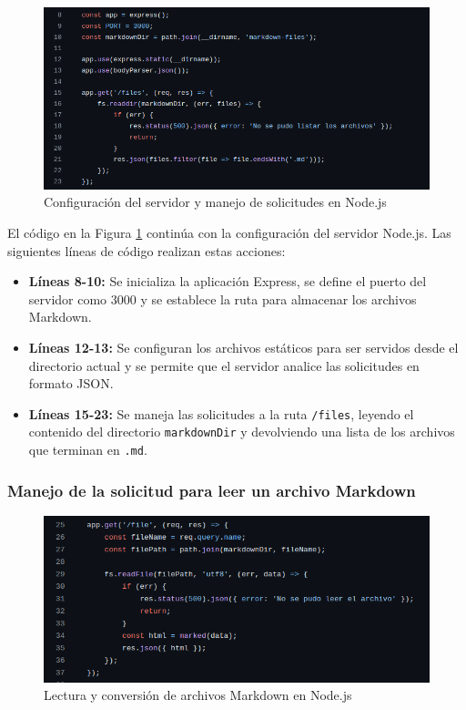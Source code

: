 \documentclass{article}
\begin{document}
\begin{figure}[h]
    \centering
    \includegraphics[width=0.9\linewidth]{latex//img/3.2.png}
    \caption{Configuración del servidor y manejo de solicitudes en Node.js}
    \label{fig:server-setup}
\end{figure}

El código en la Figura \ref{fig:server-setup} continúa con la configuración del servidor Node.js. Las siguientes líneas de código realizan estas acciones:
\begin{itemize}
    \item \textbf{Líneas 8-10:} Se inicializa la aplicación Express, se define el puerto del servidor como 3000 y se establece la ruta para almacenar los archivos Markdown.
    \item \textbf{Líneas 12-13:} Se configuran los archivos estáticos para ser servidos desde el directorio actual y se permite que el servidor analice las solicitudes en formato JSON.
    \item \textbf{Líneas 15-23:} Se maneja las solicitudes a la ruta \texttt{/files}, leyendo el contenido del directorio \texttt{markdownDir} y devolviendo una lista de los archivos que terminan en \texttt{.md}.
\end{itemize}






\subsubsection{Manejo de la solicitud para leer un archivo Markdown}
\begin{figure}[h]
    \centering
    \includegraphics[width=0.9\linewidth]{latex//img/3.3.png}
    \caption{Lectura y conversión de archivos Markdown en Node.js}
    \label{fig:read-markdown-file}
\end{figure}
\end{document}
